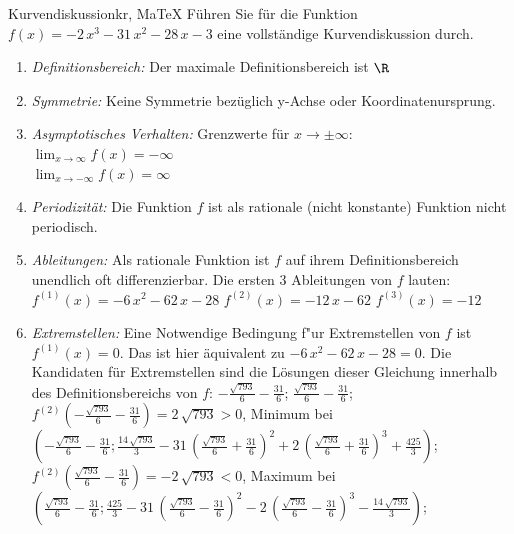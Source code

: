  \providecommand{\MoIl}{(} 
 \providecommand{\MoIr}{)}
 \providecommand{\MIntvlSep}{;} 
 \providecommand{\MElSetSep}{;} 
 \begin{MAufgabe}{Kurvendiskussion}{kr, MaTeX}
 F\"uhren Sie f\"ur die Funktion $f(x)= - 2\, x^3 - 31\, x^2 - 28\, x - 3$ eine vollst\"andige Kurvendiskussion durch.\\ 
 \ifLsg\Loesung
 \begin{enumerate}
 \item \emph{Definitionsbereich:} 
 Der maximale Definitionsbereich ist $\R$\item \emph{Symmetrie:} 
 Keine Symmetrie bez\"uglich y-Achse oder Koordinatenursprung.\item \emph{Asymptotisches Verhalten:} 
 Grenzwerte f\"ur $x\rightarrow \pm \infty$: \\ 
 $\lim_{x\rightarrow \infty} f(x)=- \infty$ \\ 
 $\lim_{x\rightarrow -\infty} f(x)=\infty$ \\ 
 \item \emph{Periodizit\"at:} 
 Die Funktion $f$ ist als rationale (nicht konstante) Funktion nicht periodisch.\item \emph{Ableitungen:} 
 Als rationale Funktion ist $f$ auf ihrem Definitionsbereich unendlich oft differenzierbar. 
 Die ersten 3 Ableitungen von $f$ lauten: \\ 
 $f^{(1)}(x)= - 6\, x^2 - 62\, x - 28$\newline 
  $f^{(2)}(x)= - 12\, x - 62$\newline 
  $f^{(3)}(x)=-12$\newline 
  \item \emph{Extremstellen:} 
 Eine Notwendige Bedingung f"ur Extremstellen von $f$ ist $f^{(1)}(x)=0$. 
 Das ist hier \"aquivalent zu $ - 6\, x^2 - 62\, x - 28=0$. 
 Die Kandidaten f\"ur Extremstellen sind die L\"osungen dieser Gleichung innerhalb des Definitionsbereichs von $f$: $ - \frac{\sqrt{793}}{6} - \frac{31}{6}$; $\frac{\sqrt{793}}{6} - \frac{31}{6}$; \\ 
 $f^{(2)}( - \frac{\sqrt{793}}{6} - \frac{31}{6})=2\, \sqrt{793}$$>0$, Minimum bei $( - \frac{\sqrt{793}}{6} - \frac{31}{6};\frac{14\, \sqrt{793}}{3} - 31\, {\left(\frac{\sqrt{793}}{6} + \frac{31}{6}\right)}^2 + 2\, {\left(\frac{\sqrt{793}}{6} + \frac{31}{6}\right)}^3 + \frac{425}{3})$; \\ 
 $f^{(2)}(\frac{\sqrt{793}}{6} - \frac{31}{6})=- 2\, \sqrt{793}$$<0$, Maximum bei $(\frac{\sqrt{793}}{6} - \frac{31}{6};\frac{425}{3} - 31\, {\left(\frac{\sqrt{793}}{6} - \frac{31}{6}\right)}^2 - 2\, {\left(\frac{\sqrt{793}}{6} - \frac{31}{6}\right)}^3 - \frac{14\, \sqrt{793}}{3})$; \\ 

\end{enumerate}
\end{MAufgabe}
